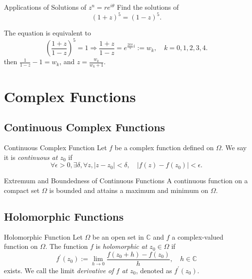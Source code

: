 \begin{example}{Applications of Solutions of $z^n = re^{i\theta}$}{}
  Find the solutions of
  \begin{equation}
    (1+z)^5 = (1-z)^5.
  \end{equation}
\end{example}

\begin{solution}
  The equation is equivalent to 
  \begin{equation}
    \left( \frac{1+z}{1-z} \right)^5 = 1 \Rightarrow
    \frac{1+z}{1-z} = e^{\frac{2k\pi}{5}i} := w_k, \quad k = 0,1,2,3,4.
  \end{equation}
  then $\frac{1}{1-z} - 1 = w_k$, and $z = \frac{w_k}{w_k + 1}$.
\end{solution}

\section{Complex Functions}

\subsection{Continuous Complex Functions}

\begin{definition}{Continuous Complex Function}{}
  Let $f$ be a complex function defined on $\Omega$.
  We say it is \emph{continuous at $z_0$} if
  \begin{equation}
    \forall \epsilon > 0, \exists \delta, \forall z, |z - z_0| < \delta,
    \quad |f(z) - f(z_0)| < \epsilon.
  \end{equation}
\end{definition}

\begin{theorem}{Extremum and Boundedness of Continuous Functions}{}
  A continuous function on a compact set $\Omega$ is bounded and
  attains a maximum and minimum on $\Omega$.
\end{theorem}

\subsection{Holomorphic Functions}

\begin{definition}{Holomorphic Function}{}
  Let $\Omega$ be an open set in $\mathbb{C}$ and $f$ a complex-valued function
  on $\Omega$. The function $f$ is \emph{holomorphic at $z_0 \in \Omega$} if
  \begin{equation}
    f^{\prime}(z_0) := \lim \limits _{h \rightarrow 0}\frac{f(z_0 + h) - f(z_0)}{h}, \quad h \in \mathbb{C}
  \end{equation}
  exists. We call the limit \emph{derivative of $f$ at $z_0$}, denoted as $f^{\prime}(z_0)$.
\end{definition}


